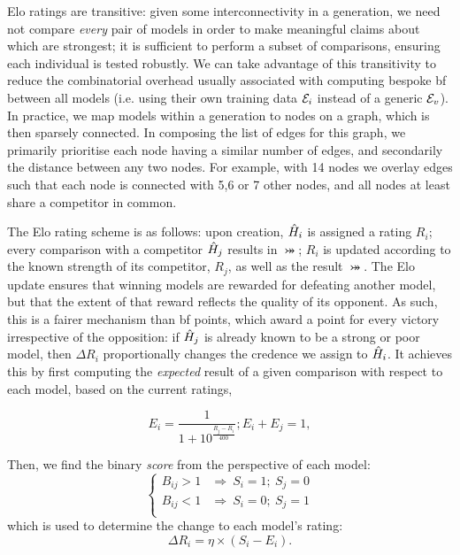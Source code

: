 \par 
Elo ratings are transitive: given some interconnectivity in a generation, 
    we need not compare \emph{every} pair of models in order to 
    make meaningful claims about which are strongest;
    it is sufficient to perform a subset of comparisons, 
    ensuring each individual is tested robustly. 
We can take advantage of this transitivity to reduce the combinatorial overhead 
    usually associated with computing bespoke \gls{bf} between all models 
    (i.e. using their own training data ${ \mathcal{E} }_i$ instead of a generic 
    ${ \mathcal{E} }_v$).
In practice, we map models within a generation to nodes on a graph,
    which is then sparsely connected. 
In composing the list of edges for this graph, 
    we primarily prioritise each node having a similar number of edges,
    and secondarily the distance between any two nodes. 
For example, with 14 nodes we overlay edges such that each node 
    is connected with 5,6 or 7 other nodes, 
    and all nodes at least share a competitor in common. 
\par 

The Elo rating scheme is as follows: 
    upon creation, $\hat{H}_i$ is assigned a rating $R_i$; 
    every comparison with a competitor $\hat{H}_j$ results in $\bij$; 
    $R_i$ is updated according to the known strength of its competitor, $R_j$, 
    as well as the result $\bij$. 
The Elo update ensures that winning models are rewarded 
    for defeating another model, 
    but that the extent of that reward reflects the quality of its opponent. 
As such, this is a fairer mechanism than \gls{bf} points, 
    which award a point for every victory irrespective of the opposition:
    if $\hat{H}_j$ is already known to be a strong or poor model, 
    then $\Delta R_i$ proportionally changes the credence we assign to $\hat{H}_i$. 
It achieves this by first computing the \emph{expected} result of a given comparison
    with respect to each model, based on the current ratings, 

\begin{subequations}
    \label{eqn:elo_expected_score}
    \begin{equation}
        E_i 
        = \frac{1}{1 + 10^{\frac{R_j - R_i}{400}}} ;
    \end{equation}
    \begin{equation}
        E_i + E_j = 1,
    \end{equation}    
\end{subequations}

Then, we find the binary \emph{score} from the perspective of each model:
\begin{equation}
    \label{eqn:elo_score}
    \begin{cases}
        B_{ij} > 1 & \Rightarrow \ S_i = 1; \ S_j =0  \\
        B_{ij} < 1 & \Rightarrow \ S_i = 0; \ S_j = 1 \\
    \end{cases}
\end{equation}
which is used to determine the change to each model's rating:
\begin{equation}
    \label{eqn:elo_delta_r}
    \Delta R_i = \eta \times \left( S_i - E_i \right).
\end{equation}

